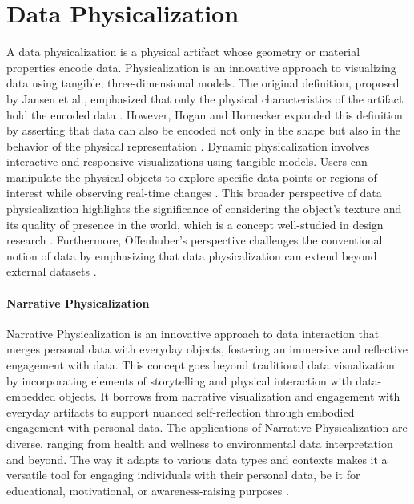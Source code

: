 \documentclass[
  a4paper,  %
  twoside,  %
  bibliography=totoc,
  headsepline,
  cleardoublepage=empty,
  parskip=half,
  draft=false
]{scrbook}
\begin{document}
\section{Data Physicalization}
A data physicalization is a physical artifact whose geometry or material properties encode data. Physicalization is an innovative approach to visualizing data using tangible, three-dimensional models. The original definition, proposed by Jansen et al., emphasized that only the physical characteristics of the artifact hold the encoded data \cite{Oppotunieites_Challenges_DataPhysicalization}. However, Hogan and Hornecker expanded this definition by asserting that data can also be encoded not only in the shape but also in the behavior of the physical representation \cite{Representation_Modality_Data_Artifacts}.
Dynamic physicalization involves interactive and responsive visualizations using tangible models. Users can manipulate the physical objects to explore specific data points or regions of interest while observing real-time changes \cite{Oppotunieites_Challenges_DataPhysicalization}. This broader perspective of data physicalization highlights the significance of considering the object's texture and its quality of presence in the world, which is a concept well-studied in design research \cite{Structures_Forms_Stuff_Interaction, Materiality_of_interaction}. Furthermore, Offenhuber's perspective challenges the conventional notion of data by emphasizing that data physicalization can extend beyond external datasets \cite{Talk_About_Physicality}.
\paragraph{Narrative Physicalization}
Narrative Physicalization is an innovative approach to data interaction that merges personal data with everyday objects, fostering an immersive and reflective engagement with data. This concept goes beyond traditional data visualization by incorporating elements of storytelling and physical interaction with data-embedded objects. It borrows from narrative visualization and engagement with everyday artifacts to support nuanced self-reflection through embodied engagement with personal data. The applications of Narrative Physicalization are diverse, ranging from health and wellness to environmental data interpretation and beyond. The way it adapts to various data types and contexts makes it a versatile tool for engaging individuals with their personal data, be it for educational, motivational, or awareness-raising purposes \cite{9200790}.
\end{document}
